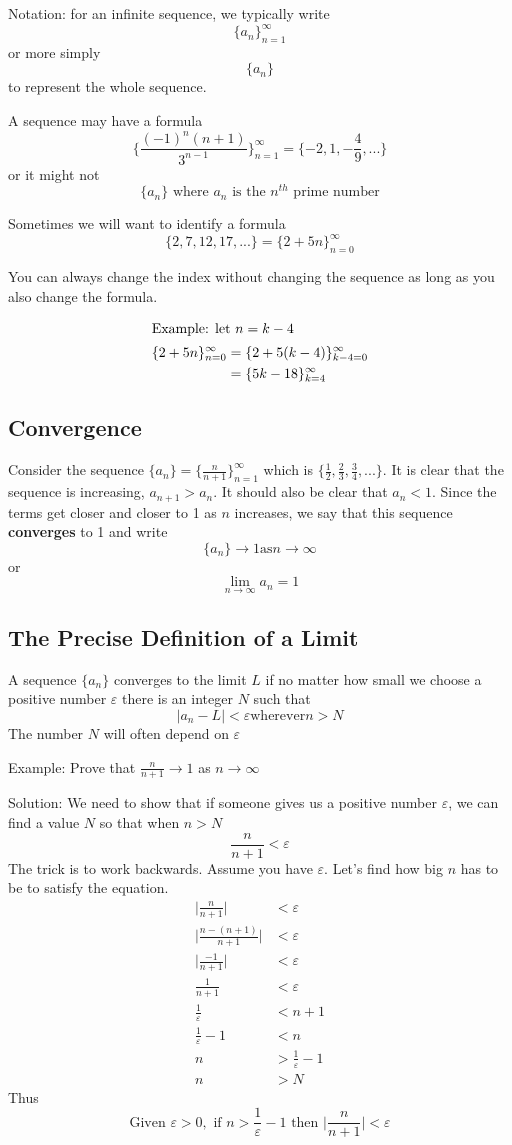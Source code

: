 \documentclass[12pt]{article}
\begin{document}
Notation: for an infinite sequence, we typically write \[ \{a_n\}_{n=1}^\infty \] or more simply \[ \{a_n\} \] to represent the whole sequence.

A sequence may have a formula \[ \{\frac{(-1)^n(n+1)}{3^{n-1}}\}_{n=1}^\infty = \{-2,1,-\frac{4}{9},...\} \] or it might not \[ \{a_n\} \text{ where $a_n$ is the $n^{th}$ prime number} \]

Sometimes we will want to identify a formula \[ \{2,7,12,17,...\} = \{2+5n\}_{n=0}^\infty \]

You can always change the index without changing the sequence as long as you also change the formula.

\begin{align*}
\intertext{Example: let $n = k-4$}
\{2+5n\}_{n=0}^\infty &= \{2+5(k-4)\}_{k-4=0}^\infty\\
&= \{5k-18\}_{k=4}^\infty
\end{align*}

\subsection*{Convergence}
Consider the sequence $\{a_n\} = \{\frac{n}{n+1}\}_{n=1}^\infty$ which is $\{\frac{1}{2},\frac{2}{3},\frac{3}{4},...\}$. It is clear that the sequence is increasing, $a_{n+1} > a_n$. It should also be clear that $a_n < 1$. Since the terms get closer and closer to 1 as $n$ increases, we say that this sequence {\bf converges} to 1 and write \[ \{a_n\}\to 1 \text{as} n\to\infty \] or \[ \displaystyle\lim_{n\to\infty}a_n = 1 \]

\subsection*{The Precise Definition of a Limit}
A sequence $\{a_n\}$ converges to the limit $L$ if no matter how small we choose a positive number $\varepsilon$ there is an integer $N$ such that \[ |a_n-L| < \varepsilon \text{wherever} n > N \] The number $N$ will often depend on $\varepsilon$

Example: Prove that $\frac{n}{n+1} \to 1$ as $n \to\infty$

Solution: We need to show that if someone gives us a positive number $\varepsilon$, we can find a value $N$ so that when $n>N$ \[ \frac{n}{n+1} < \varepsilon \] The trick is to work backwards. Assume you have $\varepsilon$. Let's find how big $n$ has to be to satisfy the equation.
\begin{align*}
\bigg|\frac{n}{n+1}\bigg| &< \varepsilon\\
\bigg|\frac{n-(n+1)}{n+1}\bigg| &< \varepsilon\\
\bigg|\frac{-1}{n+1}\bigg| &< \varepsilon\\
\frac{1}{n+1} &< \varepsilon\\
\frac{1}{\varepsilon} &< n+1\\
\frac{1}{\varepsilon} - 1 &< n\\
n &> \frac{1}{\varepsilon} - 1\\
n &> N
\end{align*}
Thus \[ \text{Given } \varepsilon > 0, \text{ if } n > \frac{1}{\varepsilon} - 1 \text{ then } \bigg|\frac{n}{n+1}\bigg| < \varepsilon \]
\end{document}
